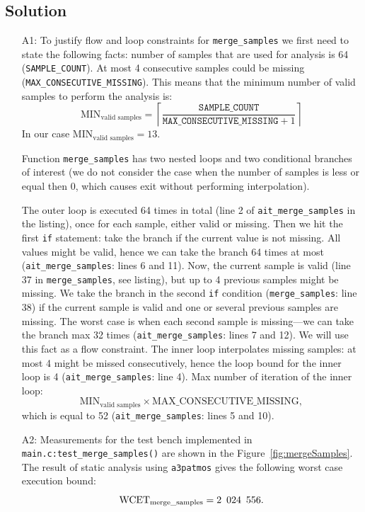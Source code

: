 \documentclass[12pt,a4paper,titlepage,oneside]{article}
\begin{document}
\subsection{Solution}
\begin{itemize}

\item[A1:]
  To justify flow and loop constraints for
  \texttt{merge\_samples} we first need to state the following facts:
  number of samples that are used for analysis is 64
  (\texttt{SAMPLE\_COUNT}). At most 4 consecutive samples could be
  missing (\texttt{MAX\_CONSECUTIVE\_MISSING}). This means that the
  minimum number of valid samples to perform the analysis is:
  \[
	{\text{MIN}_\text{valid samples}}  = \left\lceil\frac{\texttt{SAMPLE\_COUNT}}{\texttt{MAX\_CONSECUTIVE\_MISSING} + 1}\right\rceil
  \]
  In our case ${\text{MIN}_\text{valid samples}}=13$.
  
  Function \texttt{merge\_samples} has two nested loops and two conditional
  branches of interest (we do not consider the case when the number of
  samples is less or equal then 0, which causes exit without performing interpolation).

  The outer loop is executed 64 times in total (line 2 of \texttt{ait\_merge\_samples} in the
  listing), once for each sample, either valid or missing.
  Then we hit the first \texttt{if} statement: take the
  branch if the current value is not missing. All values might be valid,
  hence we can take the branch 64 times at most (\texttt{ait\_merge\_samples}:
  lines 6 and 11). Now, the current sample is valid (line 37 in
  \texttt{merge\_samples}, see listing), but up to
  4 previous samples might be missing. 
  We take the branch in the second \texttt{if} condition (\texttt{merge\_samples}: line
  38) if the current sample is valid and one or several previous 
  samples are missing.
  The worst case is when each second sample is missing---we
  can take the branch max 32 times (\texttt{ait\_merge\_samples}: lines 7
  and 12). We will use this fact as a flow
  constraint. The inner loop interpolates missing samples: at most 4
  might be missed consecutively, hence the loop bound for the inner
  loop is 4 (\texttt{ait\_merge\_samples}: line 4). 
  Max number of iteration of the inner loop:
  \[
  \text{MIN}_\text{valid samples} \times
  \text{MAX\_CONSECUTIVE\_MISSING},
  \]
  which is equal to 52
  (\texttt{ait\_merge\_samples}: lines 5 and 10).

\item[A2:]
  Measurements for the test bench implemented in
  \texttt{main.c:\discretionary{}{}{}test\_merge\_samples()} are shown in the
  Figure~\ref{fig:mergeSamples}.
	The result of static analysis using \texttt{a3patmos} gives the
	following worst case execution bound:
  \[
  \text{WCET}_{\text{merge\_samples}} = 2\enskip 024\enskip 556.
  \]


\end{itemize}
\end{document}
